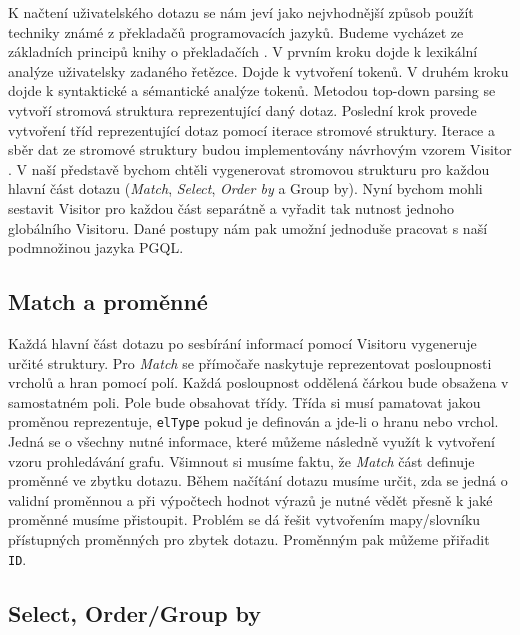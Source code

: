 K načtení uživatelského dotazu se nám jeví jako nejvhodnější způsob použít techniky známé z překladačů programovacích jazyků.
Budeme vycházet ze základních principů knihy o překladačích \citep{dragonBook}.
V prvním kroku dojde k lexikální analýze uživatelsky zadaného řetězce.
Dojde k vytvoření tokenů.
V druhém kroku dojde k syntaktické a sémantické analýze tokenů.
Metodou top-down parsing \citep[str. 217]{dragonBook} se vytvoří stromová struktura reprezentující daný dotaz.
Poslední krok provede vytvoření tříd reprezentující dotaz pomocí iterace stromové struktury.
Iterace a sběr dat ze stromové struktury budou implementovány návrhovým vzorem Visitor \citep[str. 331]{patterns}.
V naší představě bychom chtěli vygenerovat stromovou strukturu pro každou hlavní část dotazu (\textit{Match}, \textit{Select}, \textit{Order by} a Group by).
Nyní bychom mohli sestavit Visitor pro každou část separátně a vyřadit tak nutnost jednoho globálního Visitoru.
Dané postupy nám pak umožní jednoduše pracovat s naší podmnožinou jazyka PGQL.

\subsection{Match a proměnné} \label{anal.mathcandvar}

Každá hlavní část dotazu po sesbírání informací pomocí Visitoru vygeneruje určité struktury.
Pro \textit{Match} se přímočaře naskytuje reprezentovat posloupnosti vrcholů a hran pomocí polí.
Každá posloupnost oddělená čárkou bude obsažena v samostatném poli.
Pole bude obsahovat třídy.
Třída si musí pamatovat jakou proměnou reprezentuje, \verb+elType+ pokud je definován a jde-li o hranu nebo vrchol.
Jedná se o všechny nutné informace, které můžeme následně využít k vytvoření vzoru prohledávání grafu.
Všimnout si musíme faktu, že \textit{Match} část definuje proměnné ve zbytku dotazu.
Během načítání dotazu musíme určit, zda se jedná o validní proměnnou a při výpočtech hodnot výrazů je nutné vědět přesně k jaké proměnné musíme přistoupit.
Problém se dá řešit vytvořením mapy/slovníku přístupných proměnných pro zbytek dotazu.
Proměnným pak můžeme přiřadit \verb+ID+.

\subsection{Select, Order/Group by}

